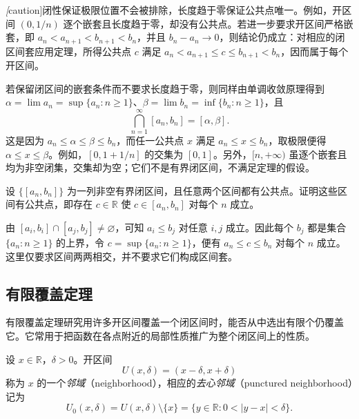 \documentclass[UTF8,12pt,a4paper,fontset=fandol]{ctexbook}
\begin{document}
\begin{remark}
\label{rem:nested-interval-assumptions}
\emph[caution]{闭性保证极限位置不会被排除，长度趋于零保证公共点唯一。}例如，开区间 $(0,1/n)$ 逐个嵌套且长度趋于零，却没有公共点。若进一步要求开区间严格嵌套，即 $a_n<a_{n+1}<b_{n+1}<b_n$，并且 $b_n-a_n\to0$，则结论仍成立：对相应的闭区间套应用定理，所得公共点 $c$ 满足 $a_n<a_{n+1}\leq c\leq b_{n+1}<b_n$，因而属于每个开区间。

若保留闭区间的嵌套条件而不要求长度趋于零，则同样由单调收敛原理得到 $\alpha=\lim a_n=\sup\{a_n:n\geq1\}$、$\beta=\lim b_n=\inf\{b_n:n\geq1\}$，且
\begin{equation}
    \bigcap_{n=1}^{\infty}[a_n,b_n]=[\alpha,\beta].
    \label{eq:nested-interval-intersection}
\end{equation}
这是因为 $a_n\leq\alpha\leq\beta\leq b_n$，而任一公共点 $x$ 满足 $a_n\leq x\leq b_n$，取极限便得 $\alpha\leq x\leq\beta$。例如，$[0,1+1/n]$ 的交集为 $[0,1]$。另外，$[n,+\infty)$ 虽逐个嵌套且均为非空闭集，交集却为空；它们不是有界闭区间，不满足定理的假设。
\end{remark}

\begin{example}
设 $\{[a_n,b_n]\}$ 为一列非空有界闭区间，且任意两个区间都有公共点。证明这些区间有公共点，即存在 $c\in\mathbb{R}$ 使 $c\in[a_n,b_n]$ 对每个 $n$ 成立。
\end{example}

\begin{solve}
由 $[a_i,b_i]\cap[a_j,b_j]\neq\varnothing$，可知 $a_i\leq b_j$ 对任意 $i,j$ 成立。因此每个 $b_j$ 都是集合 $\{a_n:n\geq1\}$ 的上界，令 $c=\sup\{a_n:n\geq1\}$，便有 $a_n\leq c\leq b_n$ 对每个 $n$ 成立。这里仅要求区间两两相交，并不要求它们构成区间套。
\end{solve}

\subsection{有限覆盖定理}
\label{subsec:finite-covering-theorem}

有限覆盖定理研究用许多开区间覆盖一个闭区间时，能否从中选出有限个仍覆盖它。它常用于把函数在各点附近的局部性质推广为整个闭区间上的性质。

\begin{definition}
\label{def:real-neighborhood}
设 $x\in\mathbb{R}$，$\delta>0$。开区间
\[
    U(x,\delta)=(x-\delta,x+\delta)
\]
称为 $x$ 的一个\emph{邻域}（neighborhood），相应的\emph{去心邻域}（punctured neighborhood）记为
\[
    U_0(x,\delta)=U(x,\delta)\setminus\{x\}
    =\{y\in\mathbb{R}:0<|y-x|<\delta\}.
\]
\end{definition}
\end{document}
